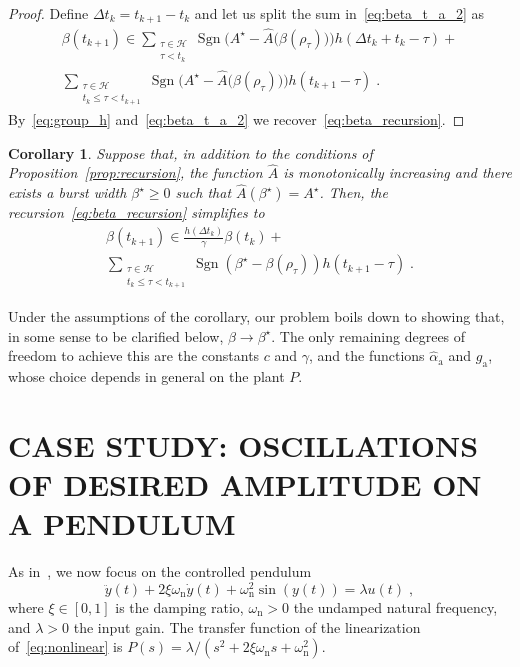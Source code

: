 \documentclass{article}
\newcommand{\HH}{\mathcal{H}}
\newcommand{\ra}{\mathrm{a}}
\newcommand{\rn}{\mathrm{n}}
\DeclareMathOperator{\sgn}{Sgn}
\newtheorem{corollary}{Corollary}
\theoremstyle{definition}
\theoremstyle{remark}
\begin{document}
\begin{proof}
    Define $\Delta t_k = t_{k+1} - t_{k}$ and let us split the sum in~\eqref{eq:beta_t_a_2} as
    \begin{multline}
        \beta\left(t_{k+1}\right) \in 
            \sum_{\substack{\tau \in \HH \\ \tau < t_{k}}}\sgn\Big(A^\star-\hat{A}\big(\beta(\rho_\tau)\big)\Big)h\left(\Delta t_k + t_{k} - \tau\right) + \\
            \sum_{\substack{\tau \in \HH \\ t_{k} \le \tau < t_{k+1}}}\sgn\Big(A^\star-\hat{A}\big(\beta(\rho_\tau)\big)\Big)h\left(t_{k+1}-\tau\right) \;.
    \end{multline}
    By~\eqref{eq:group_h} and~\eqref{eq:beta_t_a_2} we recover~\eqref{eq:beta_recursion}.
\end{proof}

\begin{corollary} \label{cor:recusion}
    Suppose that, in addition to the conditions of Proposition~\ref{prop:recursion}, the function $\hat{A}$ is monotonically increasing and there exists a burst width $\beta^\star \ge 0$ such that $\hat{A}(\beta^\star) = A^\star$. Then, the recursion~\eqref{eq:beta_recursion} simplifies to
    \begin{multline} \label{eq:beta_recursion_2}
        \beta\left(t_{k+1}\right) \in \frac{h\left(\Delta t_k\right)}{\gamma}\beta\left(t_{k}\right) + \\
            \sum_{\substack{\tau \in \HH \\ t_{k} \le \tau < t_{k+1}}}\sgn\left(\beta^\star-\beta\left(\rho_\tau\right)\right)h\left(t_{k+1}-\tau\right) \;.
    \end{multline}
\end{corollary}

Under the assumptions of the corollary, our problem boils down to showing that, in some sense to be clarified below, $\beta\to\beta^\star$. The only remaining degrees of freedom to achieve this are the constants $c$ and $\gamma$, and the functions $\hat{\alpha}_\ra$ and $g_\ra$, whose choice depends in general on the plant $P$.

\section{CASE STUDY: OSCILLATIONS OF DESIRED AMPLITUDE ON A PENDULUM}

As in~\cite{schmetterling2024,fernandez2023neuromorphic}, we now focus on the controlled pendulum
\begin{equation} \label{eq:nonlinear}
    \ddot{y}(t) + 2\xi \omega_\rn \dot{y}(t) + \omega_\rn^2 \sin(y(t)) = \lambda u(t) \;, 
\end{equation}
where $\xi \in [0, 1]$ is the damping ratio, $\omega_\rn > 0$ the undamped natural frequency, and $\lambda > 0$ the input gain. The transfer function of the linearization of~\eqref{eq:nonlinear} is $P(s) = \lambda/(s^2 + 2\xi \omega_\rn s + \omega_\rn^2)$.
\end{document}

